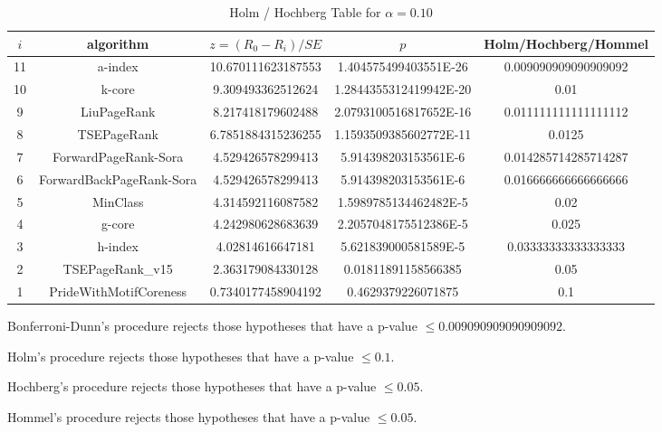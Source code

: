 \documentclass[a4paper,10pt]{article}
\begin{document}
\begin{landscape}
\begin{table}[!htp]
\centering\tiny
\caption{Holm / Hochberg Table for $\alpha=0.10$}
\begin{tabular}{ccccc}
$i$&algorithm&$z=(R_0 - R_i)/SE$&$p$&Holm/Hochberg/Hommel\\
\hline
11&a-index&10.670111623187553&1.404575499403551E-26&0.009090909090909092\\
10&k-core&9.309493362512624&1.2844355312419942E-20&0.01\\
9&LiuPageRank&8.217418179602488&2.0793100516817652E-16&0.011111111111111112\\
8&TSEPageRank&6.7851884315236255&1.1593509385602772E-11&0.0125\\
7&ForwardPageRank-Sora&4.529426578299413&5.914398203153561E-6&0.014285714285714287\\
6&ForwardBackPageRank-Sora&4.529426578299413&5.914398203153561E-6&0.016666666666666666\\
5&MinClass&4.314592116087582&1.5989785134462482E-5&0.02\\
4&g-core&4.242980628683639&2.2057048175512386E-5&0.025\\
3&h-index&4.02814616647181&5.621839000581589E-5&0.03333333333333333\\
2&TSEPageRank_v15&2.363179084330128&0.01811891158566385&0.05\\
1&PrideWithMotifCoreness&0.7340177458904192&0.4629379226071875&0.1\\
\hline
\end{tabular}
\end{table}
Bonferroni-Dunn's procedure rejects those hypotheses that have a p-value $\le0.009090909090909092$.


Holm's procedure rejects those hypotheses that have a p-value $\le0.1$.


Hochberg's procedure rejects those hypotheses that have a p-value $\le0.05$.


Hommel's procedure rejects those hypotheses that have a p-value $\le0.05$.



\end{landscape}
\end{document}
